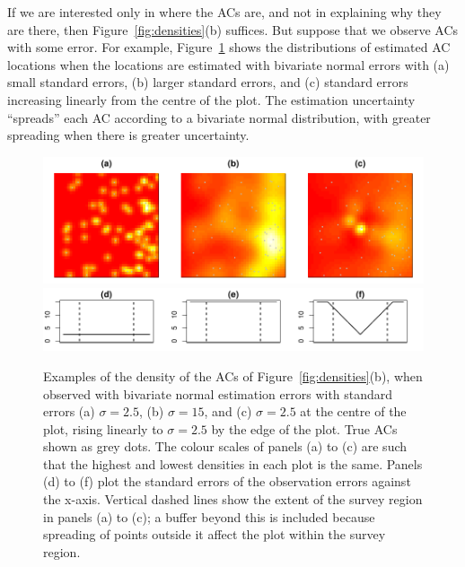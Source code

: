 \documentclass[10pt,a4paper]{article}
\begin{document}
If we are interested only in where the ACs are, and not in explaining why they are there, then Figure~\ref{fig:densities}(b) suffices. But suppose that we observe ACs with some error. For example, Figure~\ref{fig:acesterr} shows the distributions of estimated AC locations when the locations are estimated with bivariate normal errors with (a) small standard errors, (b) larger standard errors, and (c) standard errors increasing linearly from the centre of the plot. The estimation uncertainty ``spreads'' each AC according to a bivariate normal distribution, with greater spreading when there is greater uncertainty.

\begin{figure}[htbp]
\centering
\includegraphics[width=\textwidth]{acesterr.pdf}
\includegraphics[width=\textwidth]{sigmas.pdf}
\caption{Examples of the density of the ACs of Figure~\ref{fig:densities}(b), when observed with bivariate normal estimation errors with standard errors (a) $\sigma=2.5$, (b) $\sigma=15$, and (c) $\sigma=2.5$ at the centre of the plot, rising linearly to $\sigma=2.5$ by the edge of the plot. True ACs shown as grey dots. The colour scales of panels (a) to (c) are such that the highest and lowest densities in each plot is the same.
Panels (d) to (f) plot the standard errors of the observation errors against the x-axis. Vertical dashed lines show the extent of the survey region in panels (a) to (c); a buffer beyond this is included because spreading of points outside it affect the plot within the survey region.}
\label{fig:acesterr}
\end{figure}
\end{document}
